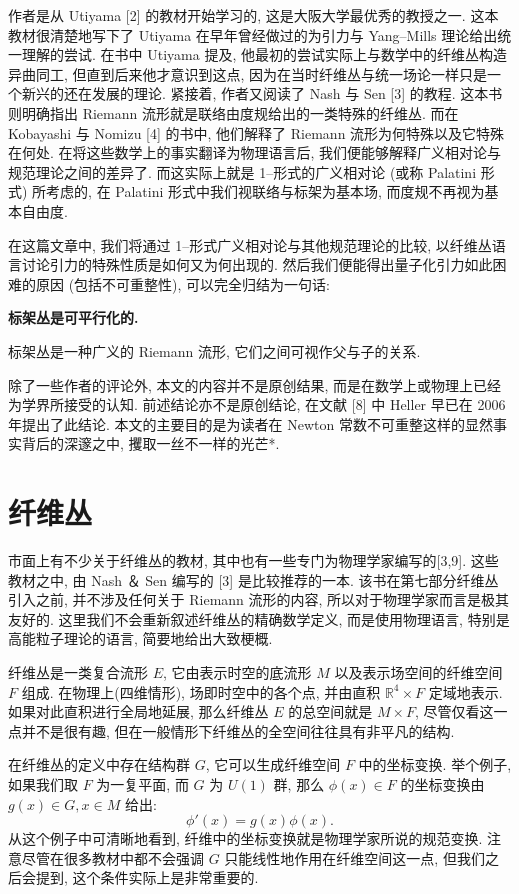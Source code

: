 \documentclass{article}
\begin{document}
\indent 作者是从 Utiyama [2] 的教材开始学习的, 这是大阪大学最优秀的教授之一. 这本教材很清楚地写下了 Utiyama 在早年曾经做过的为引力与 Yang--Mills 理论给出统一理解的尝试. 在书中 Utiyama 提及, 他最初的尝试实际上与数学中的纤维丛构造异曲同工, 但直到后来他才意识到这点, 因为在当时纤维丛与统一场论一样只是一个新兴的还在发展的理论. 紧接着, 作者又阅读了 Nash 与 Sen [3] 的教程. 这本书则明确指出 Riemann 流形就是联络由度规给出的一类特殊的纤维丛. 而在 Kobayashi 与 Nomizu [4] 的书中, 他们解释了 Riemann 流形为何特殊以及它特殊在何处. 在将这些数学上的事实翻译为物理语言后, 我们便能够解释广义相对论与规范理论之间的差异了. 而这实际上就是 1--形式的广义相对论 (或称 Palatini 形式) 所考虑的, 在 Palatini 形式中我们视联络与标架为基本场, 而度规不再视为基本自由度.
\par
在这篇文章中, 我们将通过 1--形式广义相对论与其他规范理论的比较, 以纤维丛语言讨论引力的特殊性质是如何又为何出现的. 然后我们便能得出量子化引力如此困难的原因 (包括不可重整性), 可以完全归结为一句话:
\begin{center}
\textbf{标架丛是可平行化的.}
\end{center}
标架丛是一种广义的 Riemann 流形, 它们之间可视作父与子的关系.
\par
除了一些作者的评论外, 本文的内容并不是原创结果, 而是在数学上或物理上已经为学界所接受的认知. 前述结论亦不是原创结论, 在文献 [8] 中 Heller 早已在 2006 年提出了此结论. 本文的主要目的是为读者在 Newton 常数不可重整这样的显然事实背后的深邃之中, 攫取一丝不一样的光芒*.
\section{纤维丛}
市面上有不少关于纤维丛的教材, 其中也有一些专门为物理学家编写的[3,9]. 这些教材之中, 由 Nash ＆ Sen 编写的 [3] 是比较推荐的一本. 该书在第七部分纤维丛引入之前, 并不涉及任何关于 Riemann 流形的内容, 所以对于物理学家而言是极其友好的. 这里我们不会重新叙述纤维丛的精确数学定义, 而是使用物理语言, 特别是高能粒子理论的语言, 简要地给出大致梗概.

纤维丛是一类复合流形 $E$, 它由表示时空的底流形 $M$ 以及表示场空间的纤维空间 $F$ 组成. 在物理上(四维情形), 场即时空中的各个点, 并由直积 $\mathbb{R}^{4}\times F$ 定域地表示. 如果对此直积进行全局地延展, 那么纤维丛 $E$ 的总空间就是 $ M\times F$, 尽管仅看这一点并不是很有趣, 但在一般情形下纤维丛的全空间往往具有非平凡的结构.

在纤维丛的定义中存在结构群 $G$, 它可以生成纤维空间 $F$ 中的坐标变换. 举个例子, 如果我们取 $F$ 为一复平面, 而 $G$ 为 $U(1)$ 群, 那么 $\phi(x) \in F$ 的坐标变换由 $g(x) \in G, x \in M$ 给出:
\begin{equation}
\phi'(x)=g(x)\phi(x).
\end{equation}
从这个例子中可清晰地看到, 纤维中的坐标变换就是物理学家所说的规范变换. 注意尽管在很多教材中都不会强调 $G$ 只能线性地作用在纤维空间这一点, 但我们之后会提到, 这个条件实际上是非常重要的. 
\end{document}

